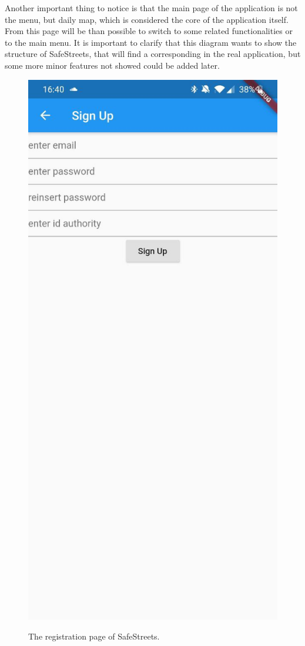 \documentclass[../RASD.tex]{subfiles}
\begin{document}
    Another important thing to notice is that the main page of the application is not the menu, but daily map, which is considered the core of the application itself.
    From this page will be than possible to switch to some related functionalities or to the main menu.
    It is important to clarify that this diagram wants to show the structure of SafeStreets, that will find a corresponding in the real application,
    but some more minor features not showed could be added later.
    \begin{figure}[H]
        \centering
        \includegraphics[scale = 0.2]{assets/app_screenshots/signup.jpg}\\[1.6 cm]
        \caption[\textit{Sign Up} Screenshot]{The registration page of SafeStreets.}
    \end{figure}
\end{document}

